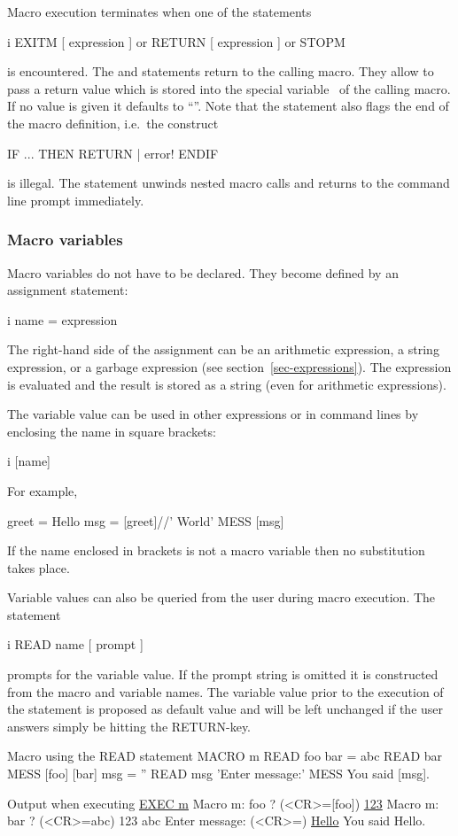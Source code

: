 Macro execution terminates when one of the statements
\begin{Gray}{i}
   EXITM  [ expression ]
or
   RETURN  [ expression ]
or
   STOPM
\end{Gray}
is encountered.
The  and  statements return to the calling
macro.
They allow to pass a return value which is stored into the
special variable~\Lit{[@]} of the calling macro.
If no value is given it defaults to ``''.
Note that the  statement also flags the end of the macro
definition, i.e.\ the construct
\begin{XMP}
IF ... THEN
  RETURN         | error!
ENDIF
\end{XMP}
is illegal.
The  statement unwinds nested macro calls and returns to
the command line prompt immediately.


\subsubsection{Macro variables}

Macro variables do not have to be declared.
They become defined by an assignment statement:
\begin{Gray}{i}
name = expression
\end{Gray}
The right-hand side of the assignment can be an arithmetic expression,
a string expression, or a garbage expression 
(see section~\ref{sec-expressions}).
The expression is evaluated and the result is stored
as a string (even for arithmetic expressions).

The variable value can be used in other expressions or in command
lines by enclosing the name in square brackets:
\begin{Gray}{i}
[name]
\end{Gray}
For example,
\begin{XMP}
greet = Hello
msg = [greet]//' World'
MESS [msg]
\end{XMP}
If the name enclosed in brackets is not a macro variable then no
substitution takes place.

Variable values can also be queried from the user during macro
execution.
The statement
\begin{Gray}{i}
READ  name  [ prompt ]
\end{Gray}
prompts for the variable value.
If the prompt string is omitted it is constructed from the macro and
variable names.
The variable value prior to the execution of the  statement
is proposed as default value and
will be left unchanged if the user answers simply be hitting the
\textsc{RETURN}-key. 
\begin{XMPin}{Macro using the READ statement}
MACRO m
READ foo
bar = abc
READ bar
MESS [foo] [bar]
msg = ''
READ msg 'Enter message:'
MESS You said [msg].
\end{XMPin}
\begin{XMPout}{Output when executing}
\PROMPT{} \underline{EXEC m}
 Macro m: foo ? (<CR>=[foo]) \underline{123}
 Macro m: bar ? (<CR>=abc)
 123 abc
 Enter message: (<CR>=) \underline{Hello}
 You said Hello.
\end{XMPout}


